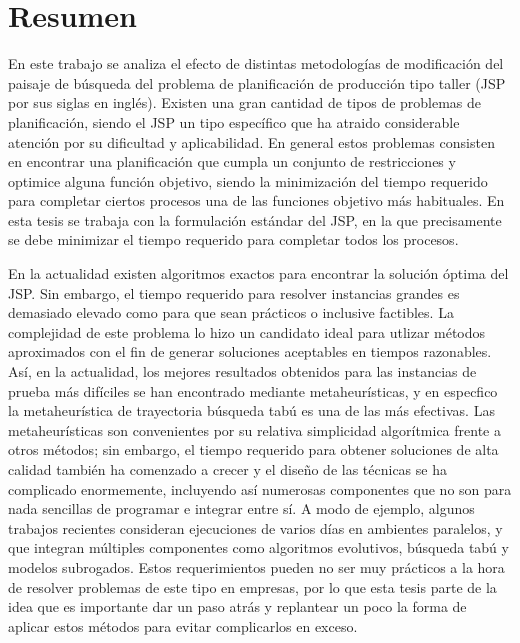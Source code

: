 \chapter*{Resumen}
En este trabajo se analiza el efecto de distintas metodologías de modificación del paisaje de búsqueda del problema de planificación 
de producción tipo taller (JSP por sus siglas en inglés).
%
Existen una gran cantidad de tipos de problemas de planificación, siendo el JSP un tipo específico que ha atraido considerable atención 
por su dificultad y aplicabilidad. 
%
En general estos problemas consisten en encontrar una planificación que cumpla un conjunto de restricciones y optimice alguna función
objetivo, siendo la minimización del tiempo requerido para completar ciertos procesos una de las funciones objetivo más habituales.
%
En esta tesis se trabaja con la formulación estándar del JSP, en la que precisamente se debe minimizar el tiempo requerido para completar
todos los procesos.

En la actualidad existen algoritmos exactos para encontrar la solución óptima del JSP\cite{Brucker1994}.
%
Sin embargo, el tiempo requerido para resolver instancias grandes es demasiado elevado como para que sean prácticos o inclusive factibles.
%
La complejidad de este problema lo hizo un candidato ideal para utlizar métodos aproximados con el fin de generar soluciones aceptables 
en tiempos razonables. 
%
Así, en la actualidad, los mejores resultados obtenidos para las instancias de prueba más difíciles se han encontrado mediante metaheurísticas, y
en especfico la metaheurística de trayectoria búsqueda tabú es una de las más efectivas.
%
Las metaheurísticas son convenientes por su relativa simplicidad algorítmica frente a otros métodos; sin embargo, el tiempo requerido para obtener 
soluciones de alta calidad también ha comenzado a crecer y el diseño de las técnicas se ha complicado enormemente, incluyendo así numerosas
componentes que no son para nada sencillas de programar e integrar entre sí.
%
A modo de ejemplo, algunos trabajos recientes consideran ejecuciones de varios días en ambientes paralelos, y que integran múltiples componentes
como algoritmos evolutivos, búsqueda tabú y modelos subrogados.
%
Estos requerimientos pueden no ser muy prácticos a la hora de resolver problemas de este tipo en empresas, por lo que esta tesis parte de la
idea que es importante dar un paso atrás y replantear un poco la forma de aplicar estos métodos para evitar complicarlos en exceso.

